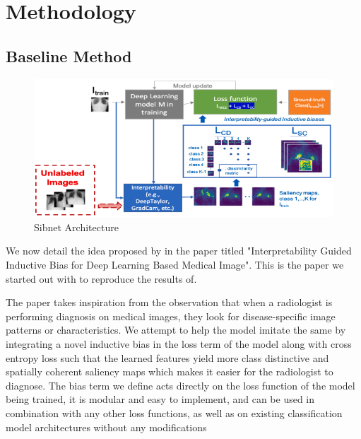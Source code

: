 \chapter{Methodology}
\ifpdf
    \graphicspath{{Chapter2/Chapter2Figs/PNG/}{Chapter2/Chapter2Figs/PDF/}{Chapter2/Chapter2Figs/}}
\else
    \graphicspath{{Chapter2/Chapter2Figs/EPS/}{Chapter2/Chapter2Figs/}}
\fi

\section{Baseline Method}

\begin{figure}[!htbp]
  \begin{center}
    \leavevmode
    \ifpdf
      \includegraphics[scale=0.75]
      {Chapter2/Chapter2Figs/sibnet_arch.png}    
    \fi
    \caption{Sibnet Architecture}
    \label{sibnet_arch}
  \end{center}
\end{figure}

We now detail the idea proposed by \cite{MAHAPATRA2022102551} in the paper titled "Interpretability Guided Inductive Bias for Deep Learning Based Medical Image". This is the paper we started out with to reproduce the results of.

The paper takes inspiration from the observation that when a radiologist is performing diagnosis on medical images, they look for disease-specific image patterns or characteristics. We attempt to help the model imitate the same by integrating a novel inductive bias in the loss term of the model along with cross entropy loss such that the learned features yield more class distinctive and spatially coherent saliency maps which makes it easier for the radiologist to diagnose. The bias term we define acts directly on the loss function of the model being trained, it is modular and easy to implement, and can be used in combination with any other loss functions, as well as on existing classification model architectures without any modifications

